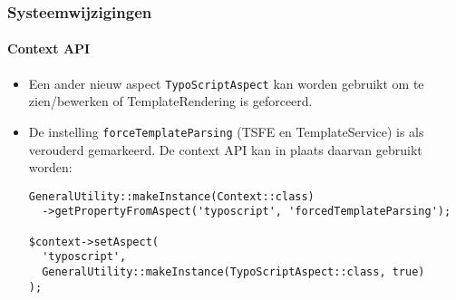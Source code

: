 
\begin{frame}[fragile]
	\frametitle{Systeemwijzigingen}
	\framesubtitle{Context API}

	\lstset{basicstyle=\tiny\ttfamily}

	\begin{itemize}

		\item Een ander nieuw aspect \texttt{TypoScriptAspect} kan worden gebruikt om te zien/bewerken of
			TemplateRendering is geforceerd.

		\item De instelling \texttt{forceTemplateParsing} (TSFE en TemplateService) is als verouderd gemarkeerd.
			De context API kan in plaats daarvan gebruikt worden:
\begin{lstlisting}
GeneralUtility::makeInstance(Context::class)
  ->getPropertyFromAspect('typoscript', 'forcedTemplateParsing');

$context->setAspect(
  'typoscript',
  GeneralUtility::makeInstance(TypoScriptAspect::class, true)
);
\end{lstlisting}

	\end{itemize}

\end{frame}

%
%
%
%
%
%
%


